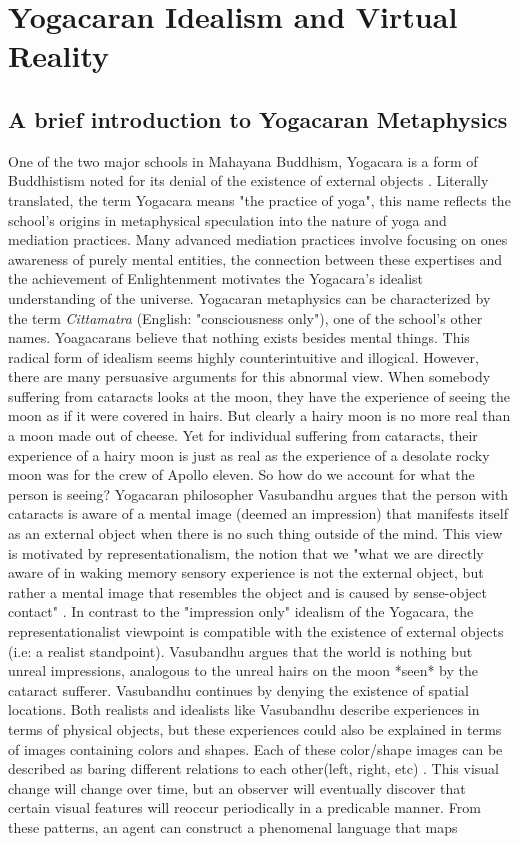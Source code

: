 \chapter{Yogacaran Idealism and Virtual Reality}
\section{A brief introduction to Yogacaran Metaphysics} 
One of the two major schools in Mahayana Buddhism, Yogacara is a form of Buddhistism noted for its denial of the existence of external objects \cite{siderits2007buddhism} . Literally translated, the term Yogacara means "the practice of yoga", this name reflects the school's origins in metaphysical speculation into the nature of yoga and mediation practices. Many advanced mediation practices involve focusing on ones awareness of purely mental entities, the connection between these expertises and the achievement of Enlightenment motivates the Yogacara's idealist understanding of the universe. Yogacaran metaphysics can be characterized by the term \textit{Cittamatra} (English: "consciousness only"), one of the school's other names. Yoagacarans believe that nothing exists besides mental things. This radical form of idealism seems highly counterintuitive and illogical. However, there are many persuasive arguments for this abnormal view. When somebody suffering from cataracts looks at the moon, they have the experience of seeing the moon as if it were covered in hairs. But clearly a hairy moon is no more real than a moon made out of cheese. Yet for individual suffering from cataracts, their experience of a hairy moon is just as real as the experience of a desolate rocky moon was for the crew of Apollo eleven. So how do we account for what the person is seeing? Yogacaran philosopher Vasubandhu argues that the person with cataracts is aware of a mental image (deemed an impression) that manifests itself as an external object when there is no such thing outside of the mind. This view is motivated by representationalism, the notion that we "what we are directly aware of in waking memory sensory experience is not the external object, but rather a mental image that resembles the object and is caused by sense-object contact" \cite{siderits2007buddhism}. In contrast to the "impression only" idealism of the Yogacara, the representationalist viewpoint is compatible with the existence of external objects (i.e: a realist standpoint). Vasubandhu argues that the world is nothing but unreal impressions, analogous to the unreal hairs on the moon *seen* by the cataract sufferer. Vasubandhu continues by denying the existence of spatial locations. Both realists and idealists like Vasubandhu describe experiences in terms of physical objects, but these experiences could also be explained in terms of images containing colors and shapes. Each of these color/shape images can be described as baring different relations to each other(left, right, etc) \cite{siderits2007buddhism}. This visual change will change over time, but an observer will eventually discover that certain visual features will reoccur periodically in a predicable manner. From these patterns, an agent can construct a phenomenal language that maps 